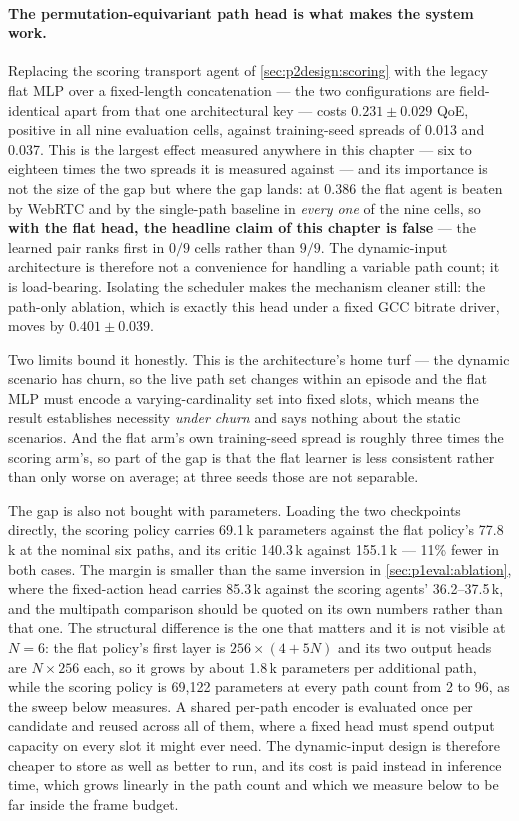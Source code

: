 \paragraph{The permutation-equivariant path head is what makes the system work.} Replacing the scoring
transport agent of \cref{sec:p2design:scoring} with the legacy flat MLP over a fixed-length
concatenation --- the two configurations are field-identical apart from that one architectural key ---
costs $0.231 \pm 0.029$ QoE, positive in all nine evaluation cells, against training-seed spreads of
0.013 and 0.037. This is the largest effect measured anywhere in this chapter --- six to eighteen times
the two spreads it is measured against --- and its importance is not the size of the gap but where the
gap lands: at 0.386
the flat agent is beaten by WebRTC and by the single-path baseline in \emph{every one} of the nine
cells, so \textbf{with the flat head, the headline claim of this chapter is false} --- the learned pair
ranks first in $0/9$ cells rather than $9/9$. The dynamic-input architecture is therefore not a
convenience for handling a variable path count; it is load-bearing. Isolating the scheduler makes the
mechanism cleaner still: the path-only ablation, which is exactly this head under a fixed GCC bitrate
driver, moves by $0.401 \pm 0.039$.

Two limits bound it honestly. This is the architecture's home turf --- the dynamic scenario has churn,
so the live path set changes within an episode and the flat MLP must encode a varying-cardinality set
into fixed slots, which means the result establishes necessity \emph{under churn} and says nothing about
the static scenarios. And the flat arm's own training-seed spread is roughly three times the scoring
arm's, so part of the gap is that the flat learner is less consistent rather than only worse on average;
at three seeds those are not separable.

The gap is also not bought with parameters. Loading the two checkpoints directly, the scoring policy
carries 69.1\,k parameters against the flat policy's 77.8\,k at the nominal six paths, and its critic
140.3\,k against 155.1\,k --- 11\% fewer in both cases. The margin is smaller than the same inversion in
\cref{sec:p1eval:ablation}, where the fixed-action head carries 85.3\,k against the scoring agents'
36.2--37.5\,k, and the multipath comparison should be quoted on its own numbers rather than that one.
The structural difference is the one that matters and it is not visible at $N = 6$: the flat policy's
first layer is $256 \times (4 + 5N)$ and its two output heads are $N \times 256$ each, so it grows by
about 1.8\,k parameters per additional path, while the scoring policy is 69,122 parameters at every path
count from 2 to 96, as the sweep below measures. A shared per-path encoder is evaluated once per
candidate and reused across all of them, where a fixed head must spend output capacity on every slot it
might ever need. The dynamic-input design is therefore cheaper to store as well as better to run, and
its cost is paid instead in inference time, which grows linearly in the path count and which we
measure below to be far inside the frame budget.

